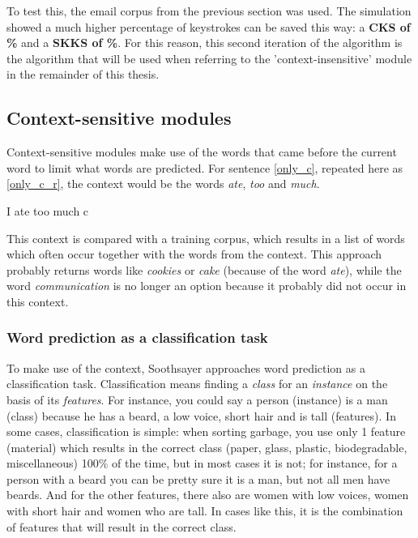 \documentclass[12pt]{article}
\begin{document}
To test this, the email corpus from the previous section was used. The simulation showed a much higher percentage of keystrokes can be saved this way: a \textbf{CKS of \%} and a \textbf{SKKS of \%}. For this reason, this second iteration of the algorithm is the algorithm that will be used when referring to the 'context-insensitive' module in the remainder of this thesis.

\subsection{Context-sensitive modules} \label{cs}

Context-sensitive modules make use of the words that came before the current word to limit what words are predicted. For sentence \ref{only_c}, repeated here as \ref{only_c_r}, the context would be the words \emph{ate}, \emph{too} and \emph{much}.

\begin{examples}
\item I ate too much c \label{only_c_r}
\end{examples}

This context is compared with a training corpus, which results in a list of words which often occur together with the words from the context. This approach probably returns words like \emph{cookies} or \emph{cake} (because of the word \emph{ate}), while the word \emph{communication} is no longer an option because it probably did not occur in this context.

\subsubsection{Word prediction as a classification task}

To make use of the context, Soothsayer approaches word prediction as a classification task. Classification means finding a \emph{class} for an \emph{instance} on the basis of its \emph{features}. For instance, you could say a person (instance) is a man (class) because he has a beard, a low voice, short hair and is tall (features). In some cases, classification is simple: when sorting garbage, you use only 1 feature (material) which results in the correct class (paper, glass, plastic, biodegradable, miscellaneous) 100\% of the time, but in most cases it is not; for instance, for a person with a beard you can be pretty sure it is a man, but not all men have beards. And for the other features, there also are women with low voices, women with short hair and women who are tall. In cases like this, it is the combination of features that will result in the correct class.
\end{document}
